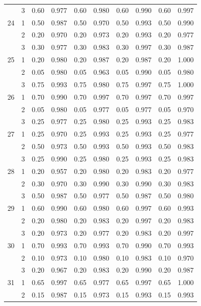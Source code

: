 \begin{longtable}{llcccccccc}
   & 3 & 0.60 & 0.977 & 0.60 & 0.980 & 0.60 & 0.990 & 0.60 & 0.997 \\ 
  24 & 1 & 0.50 & 0.987 & 0.50 & 0.970 & 0.50 & 0.993 & 0.50 & 0.990 \\ 
   & 2 & 0.20 & 0.970 & 0.20 & 0.973 & 0.20 & 0.993 & 0.20 & 0.977 \\ 
   & 3 & 0.30 & 0.977 & 0.30 & 0.983 & 0.30 & 0.997 & 0.30 & 0.987 \\ 
  25 & 1 & 0.20 & 0.980 & 0.20 & 0.987 & 0.20 & 0.987 & 0.20 & 1.000 \\ 
   & 2 & 0.05 & 0.980 & 0.05 & 0.963 & 0.05 & 0.990 & 0.05 & 0.980 \\ 
   & 3 & 0.75 & 0.993 & 0.75 & 0.980 & 0.75 & 0.997 & 0.75 & 1.000 \\ 
  26 & 1 & 0.70 & 0.990 & 0.70 & 0.997 & 0.70 & 0.997 & 0.70 & 0.997 \\ 
   & 2 & 0.05 & 0.980 & 0.05 & 0.977 & 0.05 & 0.977 & 0.05 & 0.970 \\ 
   & 3 & 0.25 & 0.977 & 0.25 & 0.980 & 0.25 & 0.993 & 0.25 & 0.983 \\ 
  27 & 1 & 0.25 & 0.970 & 0.25 & 0.993 & 0.25 & 0.993 & 0.25 & 0.977 \\ 
   & 2 & 0.50 & 0.973 & 0.50 & 0.993 & 0.50 & 0.993 & 0.50 & 0.983 \\ 
   & 3 & 0.25 & 0.990 & 0.25 & 0.980 & 0.25 & 0.993 & 0.25 & 0.983 \\ 
  28 & 1 & 0.20 & 0.957 & 0.20 & 0.980 & 0.20 & 0.983 & 0.20 & 0.977 \\ 
   & 2 & 0.30 & 0.970 & 0.30 & 0.990 & 0.30 & 0.990 & 0.30 & 0.983 \\ 
   & 3 & 0.50 & 0.987 & 0.50 & 0.977 & 0.50 & 0.987 & 0.50 & 0.980 \\ 
  29 & 1 & 0.60 & 0.990 & 0.60 & 0.980 & 0.60 & 0.997 & 0.60 & 0.993 \\ 
   & 2 & 0.20 & 0.980 & 0.20 & 0.983 & 0.20 & 0.997 & 0.20 & 0.983 \\ 
   & 3 & 0.20 & 0.973 & 0.20 & 0.977 & 0.20 & 0.983 & 0.20 & 0.997 \\ 
  30 & 1 & 0.70 & 0.993 & 0.70 & 0.993 & 0.70 & 0.990 & 0.70 & 0.993 \\ 
   & 2 & 0.10 & 0.973 & 0.10 & 0.980 & 0.10 & 0.983 & 0.10 & 0.970 \\ 
   & 3 & 0.20 & 0.967 & 0.20 & 0.983 & 0.20 & 0.990 & 0.20 & 0.987 \\ 
  31 & 1 & 0.65 & 0.997 & 0.65 & 0.977 & 0.65 & 0.997 & 0.65 & 1.000 \\ 
   & 2 & 0.15 & 0.987 & 0.15 & 0.973 & 0.15 & 0.993 & 0.15 & 0.993 \\ 

\end{longtable}
